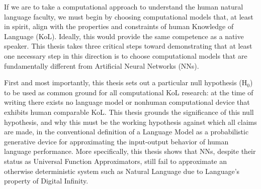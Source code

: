 % 
% 
%
If we are to take a computational approach to understand the human natural language faculty, we must begin by choosing computational models that, at least in spirit, align with the properties and constraints of human Knowledge of Language (KoL).  Ideally, this would provide the same competence as a native speaker.  This thesis takes three critical steps toward demonstrating that at least one necessary step in this direction is to choose computational models that are fundamentally different from Artificial Neural Networks (NNs).  

First and most importantly, this thesis sets out a particular null hypothesis ($\mathrm{H}_0$) to be used as common ground for all computational KoL research: at the time of writing there exists no language model or nonhuman computational device that exhibits human comparable KoL.  This thesis grounds the significance of this null hypothesis, and why this must be the working hypothesis against which all claims are made, in the conventional definition of a Language Model as a probabilistic generative device for approximating the input-output behavior of human language performance.  More specifically, this thesis shows that NNs, despite their status as Universal Function Approximators, still fail to approximate an otherwise deterministic system such as Natural Language due to Language's property of Digital Infinity.

